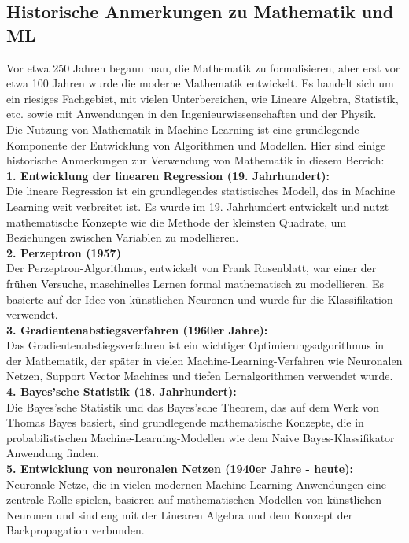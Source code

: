 \documentclass[12pt]{article}
\begin{document}
\subsection{Historische Anmerkungen zu Mathematik und ML}
%
Vor etwa 250 Jahren begann man, die Mathematik zu formalisieren, aber erst vor etwa 100 Jahren wurde die moderne Mathematik entwickelt. Es handelt sich um ein riesiges Fachgebiet, mit vielen Unterbereichen, wie Lineare Algebra, Statistik, etc. sowie mit Anwendungen in den Ingenieurwissenschaften und der Physik.\\[0.2cm]
Die Nutzung von Mathematik in Machine Learning ist eine grundlegende Komponente der Entwicklung von Algorithmen und Modellen. Hier sind einige historische Anmerkungen zur Verwendung von Mathematik in diesem Bereich:\\[0.2cm]
\textbf{1. Entwicklung der linearen Regression (19. Jahrhundert):} \\
Die lineare Regression ist ein grundlegendes statistisches Modell, das in Machine Learning weit verbreitet ist. Es wurde im 19. Jahrhundert entwickelt und nutzt mathematische Konzepte wie die Methode der kleinsten Quadrate, um Beziehungen zwischen Variablen zu modellieren.\\[0.2cm]
\textbf{2. Perzeptron (1957)}\\
Der Perzeptron-Algorithmus, entwickelt von Frank Rosenblatt, war einer der frühen Versuche, maschinelles Lernen formal mathematisch zu modellieren. Es basierte auf der Idee von künstlichen Neuronen und wurde für die Klassifikation verwendet.\\[0.2cm]
\textbf{3. Gradientenabstiegsverfahren (1960er Jahre):} \\
Das Gradientenabstiegsverfahren ist ein wichtiger Optimierungsalgorithmus in der Mathematik, der später in vielen Machine-Learning-Verfahren wie Neuronalen Netzen, Support Vector Machines und tiefen Lernalgorithmen verwendet wurde.\\[0.2cm]
\textbf{4. Bayes'sche Statistik (18. Jahrhundert):}\\
Die Bayes'sche Statistik und das Bayes'sche Theorem, das auf dem Werk von Thomas Bayes basiert, sind grundlegende mathematische Konzepte, die in probabilistischen Machine-Learning-Modellen wie dem Naive Bayes-Klassifikator Anwendung finden.\\[0.2cm]
\textbf{5. Entwicklung von neuronalen Netzen (1940er Jahre - heute):}\\
Neuronale Netze, die in vielen modernen Machine-Learning-Anwendungen eine zentrale Rolle spielen, basieren auf mathematischen Modellen von künstlichen Neuronen und sind eng mit der Linearen Algebra und dem Konzept der Backpropagation verbunden.\\[0.2cm]
\end{document}
